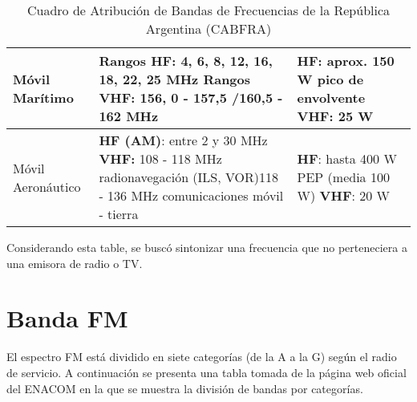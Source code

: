 \begin{table}[H]
\begin{tabular}{|l|L{6cm}|L{6cm}|}
\hline
Móvil Marítimo      & \textbf{Rangos HF:} 4, 6, 8, 12, 16, 18, 22, 25 MHz \textbf{Rangos VHF}: 156, 0 - 157,5 /160,5 - 162 MHz                                                                                             & \textbf{HF}: aprox. 150 W pico de envolvente \textbf{VHF}: 25 W                                                                                                      \\
\hline
Móvil Aeronáutico   & \textbf{HF (AM)}: entre 2 y 30 MHz \textbf{VHF:} 108 - 118 MHz radionavegación (ILS, VOR)118 - 136 MHz comunicaciones móvil - tierra                                                                 & \textbf{HF}: hasta 400 W PEP (media 100 W) \textbf{VHF}: 20 W\\
\hline
 
\end{tabular}

\caption{Cuadro de Atribuci\'on de Bandas de Frecuencias de la Rep\'ublica Argentina (CABFRA)}
\label{tab:freq}
\end{table}

Considerando esta table, se buscó sintonizar una frecuencia que no perteneciera a una emisora de radio o TV.

\section{Banda FM}

El espectro FM está dividido en siete categorías (de la A a la G) según el radio de servicio. A continuación se presenta una tabla tomada de la página web oficial del ENACOM en la que se muestra la división de bandas por categorías.

